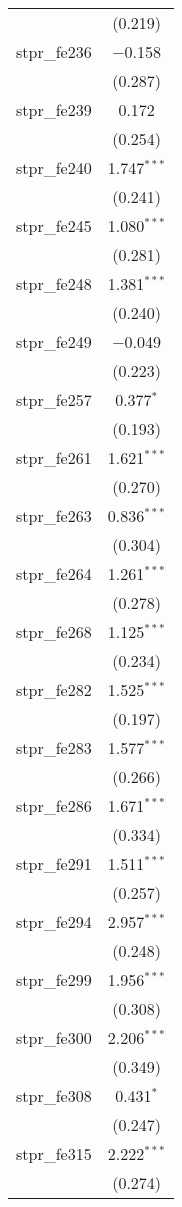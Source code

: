 \begin{table}[!htbp]
\begin{tabular}{@{\extracolsep{5pt}}lc}
  & (0.219) \\ 
  stpr\_fe236 & $-$0.158 \\ 
  & (0.287) \\ 
  stpr\_fe239 & 0.172 \\ 
  & (0.254) \\ 
  stpr\_fe240 & 1.747$^{***}$ \\ 
  & (0.241) \\ 
  stpr\_fe245 & 1.080$^{***}$ \\ 
  & (0.281) \\ 
  stpr\_fe248 & 1.381$^{***}$ \\ 
  & (0.240) \\ 
  stpr\_fe249 & $-$0.049 \\ 
  & (0.223) \\ 
  stpr\_fe257 & 0.377$^{*}$ \\ 
  & (0.193) \\ 
  stpr\_fe261 & 1.621$^{***}$ \\ 
  & (0.270) \\ 
  stpr\_fe263 & 0.836$^{***}$ \\ 
  & (0.304) \\ 
  stpr\_fe264 & 1.261$^{***}$ \\ 
  & (0.278) \\ 
  stpr\_fe268 & 1.125$^{***}$ \\ 
  & (0.234) \\ 
  stpr\_fe282 & 1.525$^{***}$ \\ 
  & (0.197) \\ 
  stpr\_fe283 & 1.577$^{***}$ \\ 
  & (0.266) \\ 
  stpr\_fe286 & 1.671$^{***}$ \\ 
  & (0.334) \\ 
  stpr\_fe291 & 1.511$^{***}$ \\ 
  & (0.257) \\ 
  stpr\_fe294 & 2.957$^{***}$ \\ 
  & (0.248) \\ 
  stpr\_fe299 & 1.956$^{***}$ \\ 
  & (0.308) \\ 
  stpr\_fe300 & 2.206$^{***}$ \\ 
  & (0.349) \\ 
  stpr\_fe308 & 0.431$^{*}$ \\ 
  & (0.247) \\ 
  stpr\_fe315 & 2.222$^{***}$ \\ 
  & (0.274) \\ 

\end{tabular}
\end{table}
